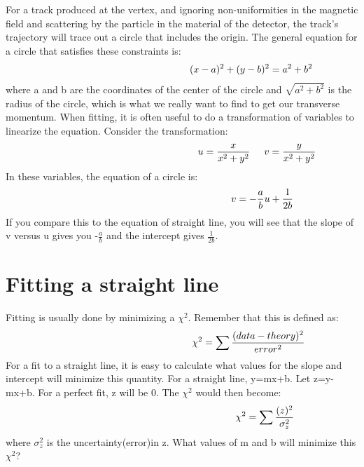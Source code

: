 For a track produced at the vertex, and ignoring non-uniformities in the magnetic field and scattering by the particle in the material of the detector, the track's trajectory will trace out a circle that includes the origin.  The general equation for a circle that satisfies these constraints is:
\begin{equation}\hspace{50 mm}
(x-a)^{2}+(y-b)^{2}=a^{2}+b^{2}
\end{equation}
where a and b are the coordinates of the center of the circle and $\sqrt{a^{2}+b^{2}}$ is the radius of the circle, which is what we really want to find to get our transverse momentum.
When fitting, it is often useful to do a transformation of variables to linearize the equation.  Consider the transformation:
\begin{equation}\hspace {54mm}
u=\frac{x}{x^{2}+y^{2}} \hspace{5 mm} v=\frac{y}{x^{2}+y^{2}}
\end{equation}
\noindent
In these variables, the equation of a circle is:
\begin{equation}\hspace{58 mm}
v =-\frac{a}{b}u+\frac{1}{2b}
\end{equation}
If you compare this to the equation of straight line, you will see that the slope of v versus u gives you -$\frac{a}{b}$ and the intercept gives $\frac{1}{2b}$.

\section{Fitting a straight line}
Fitting is usually done by minimizing a $\chi^{2}$. Remember that this is defined as: 
\begin{equation}\hspace{48 mm}
\chi^2=\sum \frac{(data-theory)^{2}}{error^{2}}
\end{equation}
For a fit to a straight line, it is easy to calculate what values for the slope and intercept will minimize this quantity. For a straight line, y=mx+b. Let z=y-mx+b. For a perfect fit, z will be 0. The $\chi^{2}$ would then become: 
\begin{equation}\hspace{60 mm}
\chi^2=\sum \frac{(z)^{2}}{\sigma_{z}^{2}}
\end{equation}
where $\sigma_{z}^{2}$ is the uncertainty(error)in z. What values of m and b will minimize this $\chi^{2}$? 

